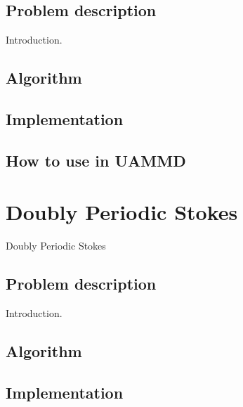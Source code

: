 \documentclass[ twoside,openright,titlepage,numbers=noenddot,%
headinclude,footinclude,cleardoublepage=empty,abstract=on,
BCOR=5mm,paper=a4,fontsize=11pt, dvipsnames
]{scrreprt}
\begin{document}
\section{Problem description}
Introduction.
\section{Algorithm}

\section{Implementation}

\section{How to use in UAMMD}


\chapter{Doubly Periodic Stokes}\label{ch:dpstokes}
Doubly Periodic Stokes
\section{Problem description}
Introduction.
\section{Algorithm}

\section{Implementation}
\end{document}
